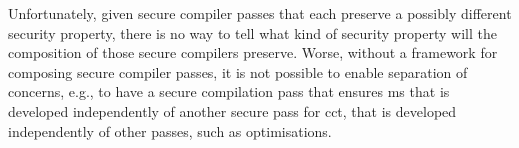 \documentclass[dvipsnames,conference]{IEEEtran}
\theoremstyle{definition}
\begin{document}

Unfortunately, given secure compiler passes that each preserve a possibly different security property, there is no way to tell what kind of security property will the composition of those secure compilers preserve.
Worse, without a framework for composing secure compiler passes, it is not possible to enable separation of concerns, e.g., to have a secure compilation pass that ensures \gls*{ms} that is developed independently of another secure pass for \gls*{cct}, that is developed independently of other passes, such as optimisations.
\end{document}
